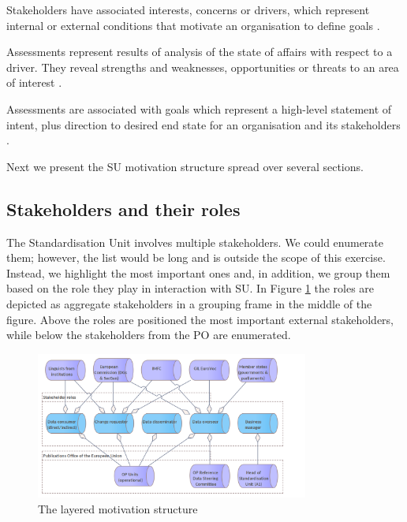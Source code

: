 	Stakeholders have associated interests, concerns or drivers, which represent internal or external conditions that motivate an organisation to define goals \citep{archimate3.1}.
	
	
	 
	Assessments represent results of analysis of the state of affairs with respect to a driver. They reveal strengths and weaknesses, opportunities or threats to an area of interest \citep{archimate3.1}.
	
	Assessments are associated with goals which represent a high-level statement of intent, plus direction to desired end state for an organisation and its stakeholders \citep{archimate3.1}. 
	
	Next we present the SU motivation structure spread over several sections.
	
	\subsection{Stakeholders and their roles}
	
	The Standardisation Unit involves multiple stakeholders. We could enumerate them; however, the list would  be long and is outside the scope of this exercise. Instead, we highlight the most important ones and, in addition, we group them based on the role they play in interaction with SU. In Figure \ref{fig:stakehodlers-roles} the roles are depicted as aggregate stakeholders in a grouping frame in the middle of the figure. Above the roles are positioned the most important external stakeholders, while below the stakeholders from the PO are enumerated.
	
	\begin{figure}[hbt!]
		\centering
		\includegraphics[width=0.8\textwidth]{images/motivation/Stakeholders & Roles.png}
		\caption{The layered motivation structure}
		\label{fig:stakehodlers-roles}
	\end{figure}
	
